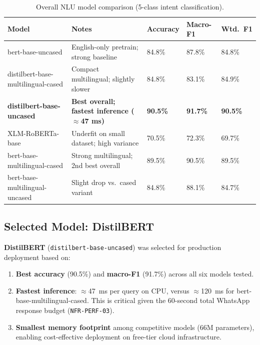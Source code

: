\begin{table}[H]
\centering
\caption{Overall NLU model comparison (5-class intent classification).}
\label{tab:nlu-results}
\small
\begin{tabularx}{\textwidth}{@{}>{\raggedright\arraybackslash}p{}Y C{0.10\textwidth} C{0.10\textwidth} C{0.10\textwidth}@{}}
\toprule
\textbf{Model} & \textbf{Notes} & \textbf{Accuracy} & \textbf{Macro-F1} & \textbf{Wtd.\ F1} \\
\midrule
bert-base-uncased
  & English-only pretrain; strong baseline
  & 84.8\% & 87.8\% & 84.8\% \\
distilbert-base-multilingual-cased
  & Compact multilingual; slightly slower
  & 84.8\% & 83.1\% & 84.9\% \\
\textbf{distilbert-base-uncased}
  & \textbf{Best overall; fastest inference ($\approx$47 ms)}
  & \textbf{90.5\%} & \textbf{91.7\%} & \textbf{90.5\%} \\
XLM-RoBERTa-base
  & Underfit on small dataset; high variance
  & 70.5\% & 72.3\% & 69.7\% \\
bert-base-multilingual-cased
  & Strong multilingual; 2nd best overall
  & 89.5\% & 90.5\% & 89.5\% \\
bert-base-multilingual-uncased
  & Slight drop vs.\ cased variant
  & 84.8\% & 88.1\% & 84.7\% \\
\bottomrule
\end{tabularx}
\end{table}

\subsection{Selected Model: DistilBERT}

\textbf{DistilBERT} (\texttt{distilbert-base-uncased}) was selected for production
deployment based on:
\begin{enumerate}
  \item \textbf{Best accuracy} (90.5\%) and \textbf{macro-F1} (91.7\%) across all
        six models tested.
  \item \textbf{Fastest inference}: $\approx$47~ms per query on CPU, versus
        $\approx$120~ms for bert-base-multilingual-cased.  This is critical given
        the 60-second total WhatsApp response budget (\texttt{NFR-PERF-03}).
  \item \textbf{Smallest memory footprint} among competitive models (66M parameters),
        enabling cost-effective deployment on free-tier cloud infrastructure.
\end{enumerate}

